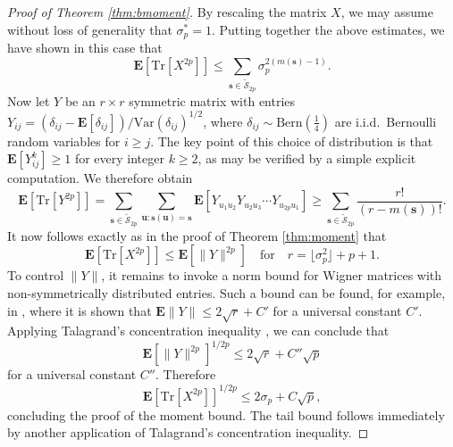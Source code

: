 \documentclass[10pt,reqno]{amsart}
\theoremstyle{definition}
\numberwithin{equation}{section}
\numberwithin{figure}{section}
\numberwithin{table}{section}
\begin{document}
\begin{proof}[Proof of Theorem \ref{thm:bmoment}]
By rescaling the matrix $X$, we may assume without loss of generality
that $\sigma_p^*=1$. Putting together the above estimates, we have shown 
in this case that
$$
	\mathbf{E}[\mathrm{Tr}[X^{2p}]] \le
	\sum_{\mathbf{s}\in\mathcal{\tilde S}_{2p}}
	\sigma_p^{2(m(\mathbf{s})-1)}.
$$
Now let $Y$ be an $r\times r$ symmetric matrix with entries
$Y_{ij}=(\delta_{ij}-\mathbf{E}[\delta_{ij}])/\mathrm{Var}(\delta_{ij})^{1/2}$, 
where $\delta_{ij}\sim \mathrm{Bern}(\tfrac{1}{4})$ are i.i.d.\ 
Bernoulli random variables for $i\ge j$. The key point of this choice of 
distribution is that $\mathbf{E}[Y_{ij}^k]\ge 1$ for every integer $k\ge 
2$, as may be verified by a simple explicit computation. We therefore 
obtain
$$
	\mathbf{E}[\mathrm{Tr}[Y^{2p}]] =
	\sum_{\mathbf{s}\in\mathcal{\tilde S}_{2p}}
	\sum_{\mathbf{u}:\mathbf{s}(\mathbf{u})=\mathbf{s}}
	\mathbf{E}[Y_{u_1u_2}Y_{u_2u_3}\cdots Y_{u_{2p}u_1}]  
	\ge \sum_{\mathbf{s}\in\mathcal{\tilde S}_{2p}}
	\frac{r!}{(r-m(\mathbf{s}))!}.
$$
It now follows exactly as in the proof of Theorem \ref{thm:moment} that
$$
	\mathbf{E}[\mathrm{Tr}[X^{2p}]] \le
	\mathbf{E}[\|Y\|^{2p}]
        \quad\mbox{for}\quad
        r=\lfloor\sigma_p^2\rfloor+p+1.
$$
To control $\|Y\|$, it remains to invoke a norm bound for Wigner 
matrices with non-symmetrically distributed entries. Such a bound can be 
found, for example, in \cite{PS07}, where it is shown that
$\mathbf{E}\|Y\|\le 2\sqrt{r}+C'$ for a universal constant $C'$.
Applying Talagrand's concentration inequality \cite[Theorem 6.10]{BLM13}, 
we can conclude that
$$
	\mathbf{E}[\|Y\|^{2p}]^{1/2p}\le
	2\sqrt{r}+C''\sqrt{p}
$$
for a universal constant $C''$. Therefore
$$
	\mathbf{E}[\mathrm{Tr}[X^{2p}]]^{1/2p} \le
	2\sigma_p+C\sqrt{p},
$$
concluding the proof of the moment bound. The tail bound
follows immediately by another application of Talagrand's
concentration inequality.
\end{proof}
\end{document}

